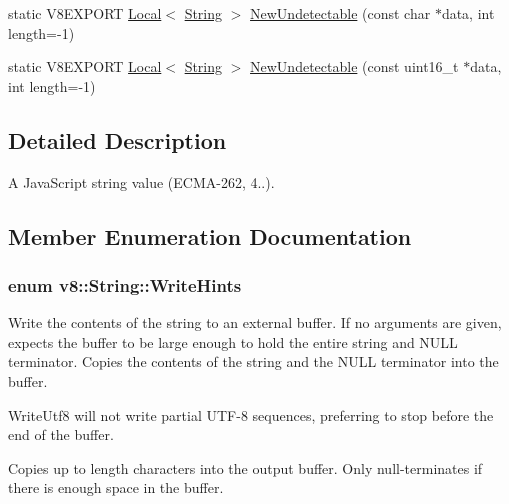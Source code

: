 \begin{DoxyCompactItemize}
\item 
static V8\+E\+X\+P\+O\+R\+T \hyperlink{classv8_1_1_local}{Local}$<$ \hyperlink{classv8_1_1_string}{String} $>$ \hyperlink{classv8_1_1_string_a49b2b16c53998e22f3ad9d06fb49a3fd}{New\+Undetectable} (const char $\ast$data, int length=-\/1)
\item 
static V8\+E\+X\+P\+O\+R\+T \hyperlink{classv8_1_1_local}{Local}$<$ \hyperlink{classv8_1_1_string}{String} $>$ \hyperlink{classv8_1_1_string_a7b39f3e76d0d62a5ca8dafc976599c57}{New\+Undetectable} (const uint16\+\_\+t $\ast$data, int length=-\/1)
\end{DoxyCompactItemize}


\subsection{Detailed Description}
A Java\+Script string value (E\+C\+M\+A-\/262, 4..). 

\subsection{Member Enumeration Documentation}
\hypertarget{classv8_1_1_string_a7f9e89f3314177022a47f2ddac7fcb6f}{}
\subsubsection[{Write\+Hints}]{\setlength{\rightskip}{0pt plus 5cm}enum {\bf v8\+::\+String\+::\+Write\+Hints}}\label{classv8_1_1_string_a7f9e89f3314177022a47f2ddac7fcb6f}
Write the contents of the string to an external buffer. If no arguments are given, expects the buffer to be large enough to hold the entire string and N\+U\+L\+L terminator. Copies the contents of the string and the N\+U\+L\+L terminator into the buffer.

Write\+Utf8 will not write partial U\+T\+F-\/8 sequences, preferring to stop before the end of the buffer.

Copies up to length characters into the output buffer. Only null-\/terminates if there is enough space in the buffer.


